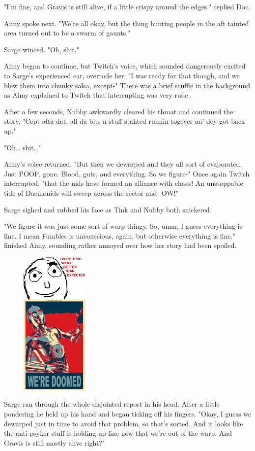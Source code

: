"I'm fine, and Gravis is still alive, if a little crispy around the edges." replied Doc.

Aimy spoke next. 
"We're all okay, but the thing hunting people in the aft tainted area turned out to be a swarm of gaunts."

Sarge winced. 
"Oh, shit."

Aimy began to continue, but Twitch's voice, which sounded dangerously excited to Sarge's experienced ear, overrode her. 
"I was ready for that though, and we blew them into chunky salsa, except-" There was a brief scuffle in the background as Aimy explained to Twitch that interrupting was very rude. 


After a few seconds, Nubby awkwardly cleared his throat and continued the story. 
"Cept afta dat, all da bits n stuff stahted runnin togever an' dey got back up."

"Oh… shit…"

Aimy's voice returned. 
"But then we dewarped and they all sort of evaporated. 
Just POOF, gone. 
Blood, guts, and everything. 
So we figure-" Once again Twitch interrupted, "that the nids have formed an alliance with chaos! 
An unstoppable tide of Daemonids will sweep across the sector and- OW!"

Sarge sighed and rubbed his face as Tink and Nubby both snickered.

"We figure it was just some sort of warp-thingy. 
So, umm, I guess everything is fine. 
I mean Fumbles is unconscious, again, but otherwise everything is fine." finished Aimy, sounding rather annoyed over how her story had been spoiled.

\begin{figure}
	\begin{center}
		\includegraphics[width=\figwidth]{pics/13/18.png}
	\end{center}
\end{figure}
Sarge ran through the whole disjointed report in his head. 
After a little pondering he held up his hand and began ticking off his fingers. 
"Okay, I guess we dewarped just in time to avoid that problem, so that's sorted. 
And it looks like the anti-psyker stuff is holding up fine now that we're out of the warp. 
And Gravis is still mostly alive right?"

